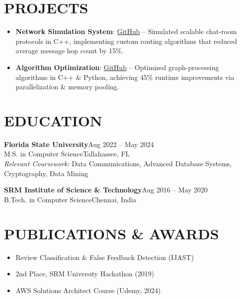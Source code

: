 \documentclass[letterpaper,10pt]{article}
\newcommand{\resumeItem}[1]{\item\small#1}
\newcommand{\resumeSubheading}[4]{%
  \vspace{6pt}\noindent
  \textbf{#1}\hfill{\footnotesize#2}\\[-1pt]
  \noindent\small#3\hfill{\small#4}\vspace{3pt}
}
\newcommand{\resumeItemsStart}{\vspace{-2pt}\begin{itemize}}
\newcommand{\resumeItemsEnd}{\end{itemize}\vspace{6pt}}
\begin{document}
\section{\textcolor{metablue}{PROJECTS}}
\small
\vspace{-5pt}
\resumeItemsStart
  \resumeItem{\textbf{Network Simulation System}: \href{https://github.com/adityasugandhi/Network-Simulation}{GitHub} – Simulated scalable chat-room protocols in C++, implementing custom routing algorithms that reduced average message hop count by 15\%.}
  \resumeItem{\textbf{Algorithm Optimization}: \href{https://github.com/adityasugandhi/LearningC-}{GitHub} – Optimized graph-processing algorithms in C++ \& Python, achieving 45\% runtime improvements via parallelization \& memory pooling.}
\resumeItemsEnd
\vspace{-12pt}
\section{\textcolor{metablue}{EDUCATION}}
\vspace{-10pt}
\small

\resumeSubheading{Florida State University}{Aug 2022 -- May 2024}{M.S. in Computer Science}{Tallahassee, FL}\\
\textit{Relevant Coursework:} Data Communications, Advanced Database Systems, Cryptography, Data Mining

\resumeSubheading{SRM Institute of Science \& Technology}{Aug 2016 -- May 2020}{B.Tech. in Computer Science}{Chennai, India}
\vspace{-10pt}

\section{\textcolor{metablue}{PUBLICATIONS & AWARDS}}
\small
\vspace{-5pt}
\begin{itemize}
  \item{Review Classification \& False Feedback Detection (IJAST)}
  \item{2nd Place, SRM University Hackathon (2019)}
  \item{AWS Solutions Architect Course (Udemy, 2024)}
\end{itemize}
\end{document}

